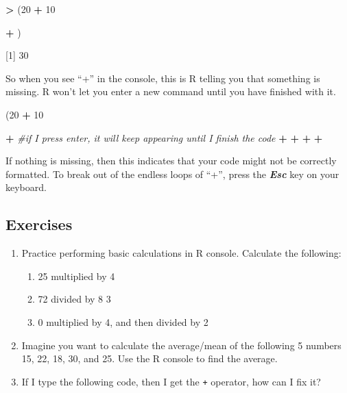 \documentclass[
]{book}
\newenvironment{Shaded}{\begin{snugshade}}{\end{snugshade}}
\newcommand{\CommentTok}[1]{\textcolor[rgb]{0.56,0.35,0.01}{\textit{#1}}}
\newcommand{\DecValTok}[1]{\textcolor[rgb]{0.00,0.00,0.81}{#1}}
\newcommand{\NormalTok}[1]{#1}
\newcommand{\SpecialCharTok}[1]{\textcolor[rgb]{0.81,0.36,0.00}{\textbf{#1}}}
\providecommand{\tightlist}{%
  \setlength{\itemsep}{0pt}\setlength{\parskip}{0pt}}
\begin{document}
\begin{Shaded}
\begin{Highlighting}[]
\SpecialCharTok{\textgreater{}}\NormalTok{ (}\DecValTok{20} \SpecialCharTok{+} \DecValTok{10}
 
\SpecialCharTok{+}\NormalTok{ )}

\NormalTok{[}\DecValTok{1}\NormalTok{] }\DecValTok{30}
\end{Highlighting}
\end{Shaded}

So when you see ``+'' in the console, this is R telling you that something is missing. R won't let you enter a new command until you have finished with it.

\begin{Shaded}
\begin{Highlighting}[]
\NormalTok{(}\DecValTok{20} \SpecialCharTok{+} \DecValTok{10}

\SpecialCharTok{+} \CommentTok{\#if I press enter, it will keep appearing until I finish the code}
\SpecialCharTok{+}
\SpecialCharTok{+}
\SpecialCharTok{+}
\SpecialCharTok{+}
\end{Highlighting}
\end{Shaded}

If nothing is missing, then this indicates that your code might not be correctly formatted. To break out of the endless loops of ``+'', press the \textbf{\emph{Esc}} key on your keyboard.

\hypertarget{exercises}{%
\subsection{Exercises}\label{exercises}}

\begin{enumerate}
\def\labelenumi{\arabic{enumi}.}
\tightlist
\item
  Practice performing basic calculations in R console. Calculate the following:

  \begin{enumerate}
  \def\labelenumii{\arabic{enumii}.}
  \tightlist
  \item
    25 multiplied by 4
  \item
    72 divided by 8 3
  \item
    0 multiplied by 4, and then divided by 2
  \end{enumerate}
\item
  Imagine you want to calculate the average/mean of the following 5 numbers 15, 22, 18, 30, and 25. Use the R console to find the average.
\item
  If I type the following code, then I get the \texttt{+} operator, how can I fix it?
\end{enumerate}
\end{document}
